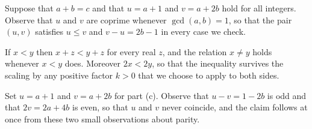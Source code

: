 \documentclass[11pt]{article}
\begin{document}
Suppose that $a+b=c$ and that $u=a+1$ and $v=a+2b$ hold for all integers.
Observe that $u$ and $v$ are coprime whenever $\gcd(a,b)=1$, so that the
pair $(u,v)$ satisfies $u\le v$ and $v-u=2b-1$ in every case we check.

If $x<y$ then $x+z<y+z$ for every real $z$, and the relation $x\ne y$ holds
whenever $x<y$ does. Moreover $2x<2y$, so that the inequality survives the
scaling by any positive factor $k>0$ that we choose to apply to both sides.

Set $u=a+1$ and $v=a+2b$ for part (c). Observe that $u-v=1-2b$ is odd and
that $2v=2a+4b$ is even, so that $u$ and $v$ never coincide, and the claim
follows at once from these two small observations about parity.
\end{document}
